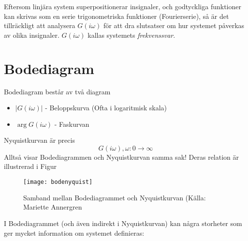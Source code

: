 \documentclass[12pt]{article}
\begin{document}
Eftersom linjära system superpositionerar insignaler, och godtyckliga funktioner kan skrivas som en serie trigonometriska funktioner (Fourierserie), så är det tillräckligt att analysera $G(i\omega)$ för att dra slutsatser om hur systemet påverkas av olika insignaler. $G(i\omega)$ kallas systemets \emph{frekvenssvar}.

\section*{Bodediagram}
Bodediagram består av två diagram
\begin{itemize}
\item $|G(i\omega)|$ - Beloppskurva (Ofta i logaritmisk skala) 
\item $\arg{G(i\omega)}$ - Faskurvan
\end{itemize}
Nyquistkurvan är precis 
\[G(i\omega), \omega: 0 \to \infty\]
Alltså visar Bodediagrammen och Nyquistkurvan samma sak! Deras relation är illustrerad i Figur

\begin{figure}[h!]
  \centering
  \texttt{[image: bodenyquist]}
  \caption{Samband mellan Bodediagrammet och Nyquistkurvan (Källa: Mariette Annergren}
  \label{fig:bodenyquist}
\end{figure}
\FloatBarrier

I Bodediagrammet (och även indirekt i Nyquistkurvan) kan några storheter som ger mycket information om systemet definieras:
\end{document}
